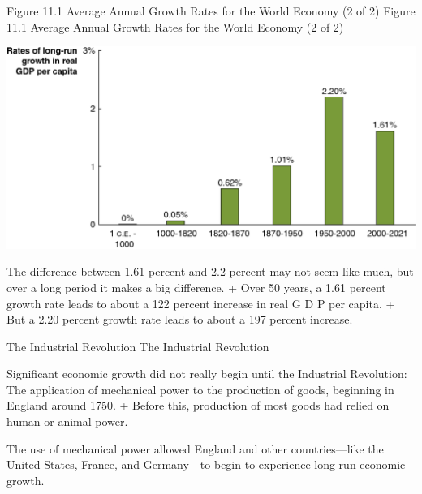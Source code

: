 \documentclass[
  12pt,
  ignorenonframetext,
]{beamer}
\begin{document}
\begin{frame}{Figure 11.1 Average Annual Growth Rates for the World
Economy (2 of 2)}
\protect\hypertarget{figure-11.1-average-annual-growth-rates-for-the-world-economy-2-of-2}{}
Figure 11.1 Average Annual Growth Rates for the World Economy (2 of 2)

\includegraphics[width=\textwidth,height=0.99\textheight]{imgs3/img_slide07a.png}

The difference between 1.61 percent and 2.2 percent may not seem like
much, but over a long period it makes a big difference. + Over 50 years,
a 1.61 percent growth rate leads to about a 122 percent increase in real
G D P per capita. + But a 2.20 percent growth rate leads to about a 197
percent increase.
\end{frame}

\begin{frame}{The Industrial Revolution}
\protect\hypertarget{the-industrial-revolution}{}
The Industrial Revolution

Significant economic growth did not really begin until the Industrial
Revolution: The application of mechanical power to the production of
goods, beginning in England around 1750. + Before this, production of
most goods had relied on human or animal power.

The use of mechanical power allowed England and other countries---like
the United States, France, and Germany---to begin to experience long-run
economic growth.
\end{frame}
\end{document}
